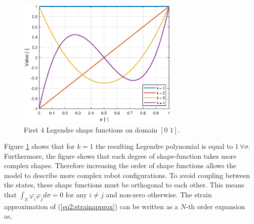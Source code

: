 \begin{figure}[H]
    \centering
    \includegraphics[width = 0.7\textwidth ]{Figures/Chapter2/shapefunction.eps}
    \caption{First 4 Legendre shape functions on domain $[0 \hspace{4pt} 1]$.}
    \label{fig2:shapefunction}
\end{figure}

Figure \ref{fig2:shapefunction} shows that for $k=1$ the resulting Legendre polynomial is equal to $1 \hspace{2pt} \forall \sigma$. Furthermore, the figure shows that each degree of shape-function takes more complex shapes. Therefore increasing the order of shape functions allows the model to describe more complex robot configurations. To avoid coupling between the states, these shape functions must be orthogonal to each other. This means that $\int_\mathbb{X} \varphi_i \varphi_j d \sigma = 0$ for any $i \neq j$ and non-zero otherwise. The strain approximation of (\ref{eq2:strainapprox}) can be written as a $N$-th order expansion as,



